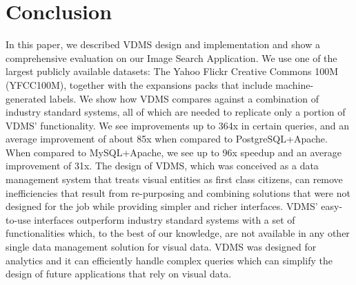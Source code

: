 \section{Conclusion}
In this paper, we described VDMS design and implementation and
show a comprehensive evaluation on our Image Search Application.
We use one of the largest publicly available datasets:
The Yahoo Flickr Creative Commons 100M (YFCC100M),
together with the expansions packs that include
machine-generated labels.
We show how VDMS compares against a combination of
industry standard systems, all of which are needed to
replicate only a portion of VDMS' functionality.
We see improvements up to 364x in certain queries,
and an average improvement of about 85x when compared to PostgreSQL+Apache.
When compared to MySQL+Apache, we see up to 96x speedup
and an average improvement of 31x.
The design of VDMS, which was conceived as a
data management system that treats visual entities
as first class citizens, can remove inefficiencies
that result from re-purposing and combining solutions
that were not designed for the job while providing
simpler and richer interfaces.
VDMS' easy-to-use interfaces outperform industry standard systems
with a set of functionalities which, to the best of our knowledge,
are not available in any other single data management solution for visual data.
VDMS was designed for analytics and it can efficiently handle complex queries
which can simplify the design of future applications that rely on visual data.
